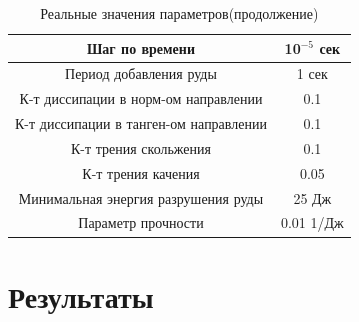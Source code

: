 \documentclass[c]{beamer}  %
\begin{document}
\begin{frame}
\frametitle{\insertsection} 
\framesubtitle{\insertsubsection}

\begin{table}[H]
\caption{Реальные значения параметров(продолжение)}
\begin{tabular}{|c|c|}

\hline
Шаг по времени & 10$^{-5}$ сек \\
\hline
Период добавления руды & 1 сек \\
\hline
К-т диссипации в норм-ом направлении & 0.1 \\
\hline
К-т диссипации в танген-ом направлении & 0.1 \\
\hline
К-т трения скольжения & 0.1 \\
\hline
К-т трения качения & 0.05 \\
\hline
Минимальная энергия разрушения руды & 25 Дж \\
\hline
Параметр прочности & 0.01 1/Дж \\
\hline
\end{tabular}
\end{table}
\end{frame}




\section{Результаты}
\end{document}
